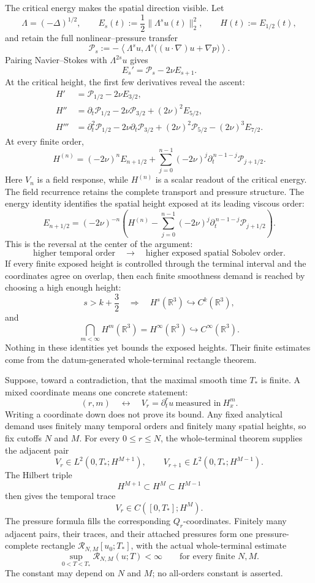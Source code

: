 \documentclass[11pt]{article}
\begin{document}
The critical energy makes the spatial direction visible. Let
\[
\Lambda=(-\Delta)^{1/2},
\qquad
E_s(t):=\frac12\|\Lambda^su(t)\|_2^2,
\qquad
H(t):=E_{1/2}(t),
\]
and retain the full nonlinear--pressure transfer
\[
\mathcal P_s
:=-\left\langle
\Lambda^su,
\Lambda^s\bigl((u\cdot\nabla)u+\nabla p\bigr)
\right\rangle.
\]
Pairing Navier--Stokes with \(\Lambda^{2s}u\) gives
\[
E_s'=\mathcal P_s-2\nu E_{s+1}.
\]
At the critical height, the first few derivatives reveal the ascent:
\[
\begin{aligned}
H'&=\mathcal P_{1/2}-2\nu E_{3/2},\\
H''&=\partial_t\mathcal P_{1/2}
-2\nu\mathcal P_{3/2}
+(2\nu)^2E_{5/2},\\
H'''&=\partial_t^2\mathcal P_{1/2}
-2\nu\partial_t\mathcal P_{3/2}
+(2\nu)^2\mathcal P_{5/2}
-(2\nu)^3E_{7/2}.
\end{aligned}
\]
At every finite order,
\[
H^{(n)}
=(-2\nu)^nE_{n+1/2}
+\sum_{j=0}^{n-1}(-2\nu)^j
\partial_t^{\,n-1-j}\mathcal P_{j+1/2}.
\]
Here \(V_n\) is a field response, while \(H^{(n)}\) is a scalar readout of the critical energy. The field recurrence retains the complete transport and pressure structure. The energy identity identifies the spatial height exposed at its leading viscous order:
\[
E_{n+1/2}
=(-2\nu)^{-n}
\left(
H^{(n)}
-\sum_{j=0}^{n-1}(-2\nu)^j
\partial_t^{\,n-1-j}\mathcal P_{j+1/2}
\right).
\]
This is the reversal at the center of the argument:
\[
\text{higher temporal order}
\quad\longrightarrow\quad
\text{higher exposed spatial Sobolev order}.
\]
If every finite exposed height is controlled through the terminal interval and the coordinates agree on overlap, then each finite smoothness demand is reached by choosing a high enough height:
\[
s>k+\frac32
\quad\Longrightarrow\quad
H^s(\mathbb R^3)\hookrightarrow C^k(\mathbb R^3),
\]
and
\[
\bigcap_{m<\infty}H^m(\mathbb R^3)
=H^\infty(\mathbb R^3)
\hookrightarrow C^\infty(\mathbb R^3).
\]
Nothing in these identities yet bounds the exposed heights. Their finite estimates come from the datum-generated whole-terminal rectangle theorem.

Suppose, toward a contradiction, that the maximal smooth time \(T_*\) is finite. A mixed coordinate means one concrete statement:
\[
(r,m)
\quad\longleftrightarrow\quad
V_r=\partial_t^r u
\ \text{measured in}\ H_x^m.
\]
Writing a coordinate down does not prove its bound. Any fixed analytical demand uses finitely many temporal orders and finitely many spatial heights, so fix cutoffs \(N\) and \(M\). For every \(0\le r\le N\), the whole-terminal theorem supplies the adjacent pair
\[
V_r\in L^2(0,T_*;H^{M+1}),
\qquad
V_{r+1}\in L^2(0,T_*;H^{M-1}).
\]
The Hilbert triple
\[
H^{M+1}\subset H^M\subset H^{M-1}
\]
then gives the temporal trace
\[
V_r\in C([0,T_*];H^M).
\]
The pressure formula fills the corresponding \(Q_r\)-coordinates. Finitely many adjacent pairs, their traces, and their attached pressures form one pressure-complete rectangle \(\mathcal R_{N,M}[u_0;T_*]\), with the actual whole-terminal estimate
\[
\sup_{0<T<T_*}\mathcal R_{N,M}(u;T)<\infty
\qquad
\text{for every finite }N,M.
\]
The constant may depend on \(N\) and \(M\); no all-orders constant is asserted.
\end{document}
